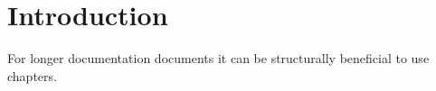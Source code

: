 \chapter{Introduction}
For longer documentation documents it can be structurally beneficial to use chapters.